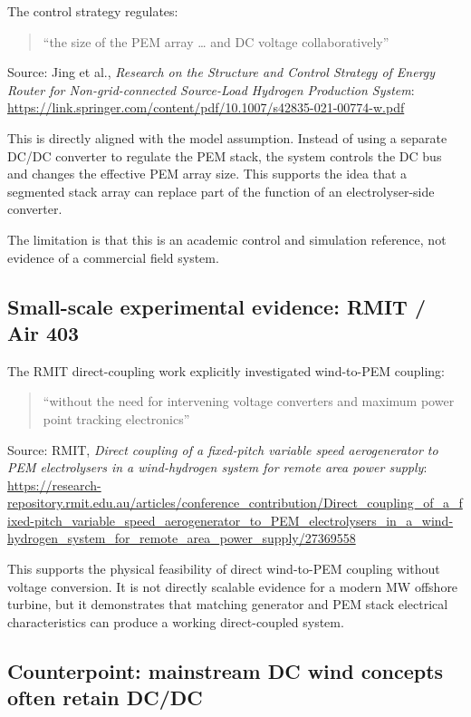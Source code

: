 \documentclass[
  letterpaper,
  DIV=11,
  numbers=noendperiod]{scrartcl}
\begin{document}
The control strategy regulates:

\begin{quote}
``the size of the PEM array \ldots{} and DC voltage collaboratively''
\end{quote}

Source: Jing et al., \emph{Research on the Structure and Control
Strategy of Energy Router for Non-grid-connected Source-Load Hydrogen
Production System}:
\url{https://link.springer.com/content/pdf/10.1007/s42835-021-00774-w.pdf}

This is directly aligned with the model assumption. Instead of using a
separate DC/DC converter to regulate the PEM stack, the system controls
the DC bus and changes the effective PEM array size. This supports the
idea that a segmented stack array can replace part of the function of an
electrolyser-side converter.

The limitation is that this is an academic control and simulation
reference, not evidence of a commercial field system.

\subsection{Small-scale experimental evidence: RMIT / Air
403}\label{small-scale-experimental-evidence-rmit-air-403}

The RMIT direct-coupling work explicitly investigated wind-to-PEM
coupling:

\begin{quote}
``without the need for intervening voltage converters and maximum power
point tracking electronics''
\end{quote}

Source: RMIT, \emph{Direct coupling of a fixed-pitch variable speed
aerogenerator to PEM electrolysers in a wind-hydrogen system for remote
area power supply}:
\url{https://research-repository.rmit.edu.au/articles/conference_contribution/Direct_coupling_of_a_fixed-pitch_variable_speed_aerogenerator_to_PEM_electrolysers_in_a_wind-hydrogen_system_for_remote_area_power_supply/27369558}

This supports the physical feasibility of direct wind-to-PEM coupling
without voltage conversion. It is not directly scalable evidence for a
modern MW offshore turbine, but it demonstrates that matching generator
and PEM stack electrical characteristics can produce a working
direct-coupled system.

\subsection{Counterpoint: mainstream DC wind concepts often retain
DC/DC}\label{counterpoint-mainstream-dc-wind-concepts-often-retain-dcdc}
\end{document}
